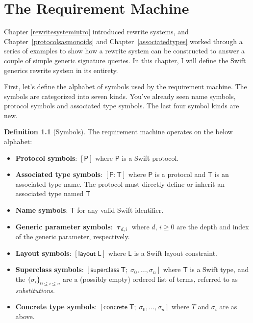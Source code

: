 \documentclass[a4paper,headsepline,bibliography=totoc,toc=flat,fleqn,twoside=semi]{scrbook}
\theoremstyle{definition}
\newtheorem{definition}{Definition}[chapter]
\theoremstyle{definition}
\theoremstyle{definition}
\newcommand{\namesym}[1]{\mathsf{#1}}
\newcommand{\proto}[1]{\bm{\mathsf{#1}}}
\newcommand{\protosym}[1]{[\proto{#1}]}
\newcommand{\genericsym}[2]{\bm{\uptau}_{#1,#2}}
\newcommand{\assocsym}[2]{[\proto{#1}\colon\namesym{#2}]}
\newcommand{\layoutsym}[1]{[\mathsf{layout\;#1}]}
\newcommand{\supersym}[1]{[\mathsf{superclass}\;#1]}
\newcommand{\concretesym}[1]{[\mathsf{concrete}\;#1]}
\begin{document}
\chapter{The Requirement Machine}\label{requirementmachine}
Chapter \ref{rewritesystemintro} introduced rewrite systems, and Chapter~\ref{protocolsasmonoids} and Chapter~\ref{associatedtypes} worked through a series of examples to show how a rewrite system can be constructed to answer a couple of simple generic signature queries. In this chapter, I will define the Swift generics rewrite system in its entirety.

First, let's define the alphabet of symbols used by the requirement machine. The symbols are categorized into seven kinds. You've already seen name symbols, protocol symbols and associated type symbols. The last four symbol kinds are new.

\begin{definition}[Symbols]\label{symboldef}
The requirement machine operates on the below alphabet:
\begin{itemize}
\item \textbf{Protocol symbols}: $\protosym{P}$ where $\proto{P}$ is a Swift protocol.
\item \textbf{Associated type symbols}: $\assocsym{P}{T}$ where $\proto{P}$ is a protocol and $\namesym{T}$ is an associated type name. The protocol must directly define or inherit an associated type named $\namesym{T}$
\item \textbf{Name symbols}: $\namesym{T}$ for any valid Swift identifier.
\item \textbf{Generic parameter symbols}: $\genericsym{d}{i}$ where $d$, $i\geq 0$ are the depth and index of the generic parameter, respectively.
\item \textbf{Layout symbols}: $\layoutsym{L}$ where $\namesym{L}$ is a Swift layout constraint.
\item \textbf{Superclass symbols}: $\supersym{\namesym{T};\;\sigma_0,\ldots,\sigma_n}$ where $\namesym{T}$ is a Swift type, and the $\{\sigma_i\}_{0\le i \le n}$ are a (possibly empty) ordered list of terms, referred to as \emph{substitutions}.
\item {} \textbf{Concrete type symbols}: $\concretesym{\namesym{T};\;\sigma_0,\ldots,\sigma_n}$ where $T$ and $\sigma_i$ are as above.
\end{itemize}
\end{definition}
\end{document}
